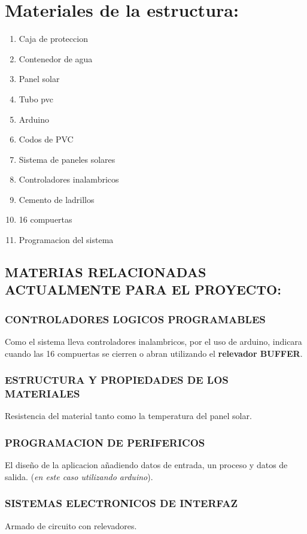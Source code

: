 \documentclass[11pt,a4paper]{article}
\begin{document}
\section{Materiales de la estructura:}
\begin{enumerate}
\item Caja de proteccion
\item Contenedor de agua
\item Panel solar
\item Tubo pvc
\item Arduino
\item Codos de PVC
\item Sistema de paneles solares
\item Controladores inalambricos
\item Cemento de ladrillos
\item 16 compuertas
\item Programacion del sistema
\end{enumerate}

\begin{center}
\subsection{MATERIAS RELACIONADAS ACTUALMENTE PARA EL PROYECTO:}
\end{center}

\subsubsection{CONTROLADORES LOGICOS PROGRAMABLES}
Como el sistema lleva controladores inalambricos, por el uso de arduino, indicara cuando las 16 compuertas se cierren o abran utilizando el \textbf{relevador BUFFER}.
\subsubsection{ESTRUCTURA Y PROPIEDADES DE LOS MATERIALES}
Resistencia del material tanto como la temperatura del panel solar.
\subsubsection{PROGRAMACION DE PERIFERICOS}
El diseño de la aplicacion añadiendo datos de entrada, un proceso y datos de salida. (\emph{en este caso utilizando arduino}). 
\subsubsection{SISTEMAS ELECTRONICOS DE INTERFAZ}
Armado de circuito con relevadores.
\end{document}
